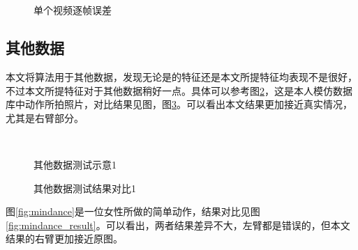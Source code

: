 \begin{figure}[htbp]
  \centering
  \\
  \\
  \caption{单个视频逐帧误差}\label{fig:error}
\end{figure}

\subsection{其他数据}
本文将算法用于其他数据，发现无论是\cite{bo2010twin}的特征还是本文所提特征均表现不是很好，不过本文所提特征对于其他数据稍好一点。具体可以参考图\ref{fig:me}，这是本人模仿数据库中动作所拍照片，对比结果见图，图\ref{fig:me_result}。可以看出本文结果更加接近真实情况，尤其是右臂部分。

\begin{figure}[htbp]
  \centering
  \hspace{.5cm}
  \hspace{.5cm}
  \\
  \hspace{.5cm}
  \hspace{.5cm}
  \caption{其他数据测试示意1}\label{fig:me}
\end{figure}

\begin{figure}[H]
  \centering
  \hspace{2cm}
  \caption{其他数据测试结果对比1}\label{fig:me_result}
\end{figure}

图\ref{fig:mindance}是一位女性所做的简单动作，结果对比见图\ref{fig:mindance_result}。可以看出，两者结果差异不大，左臂都是错误的，但本文结果的右臂更加接近原图。

